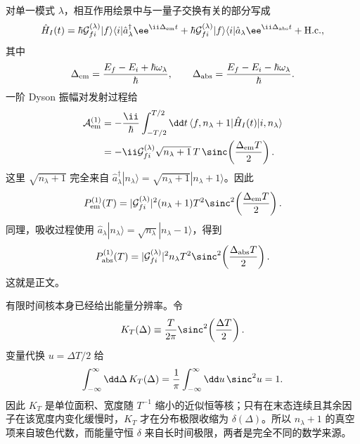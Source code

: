 \begin{derivation}
对单一模式 $\lambda$，相互作用绘景中与一量子交换有关的部分写成
\[
\hat H_I(t)
=\hbar\mathcal G_{fi}^{(\lambda)}
|f\rangle\langle i|\hat a_\lambda^\dagger
 \ee^{\ii\Delta_{\rm em}t}
+\hbar\mathcal G_{fi}^{(\lambda)}
|f\rangle\langle i|\hat a_\lambda
 \ee^{\ii\Delta_{\rm abs}t}
+\mathrm{H.c.},
\]
其中
\[
\Delta_{\rm em}
=\frac{E_f-E_i+\hbar\omega_\lambda}{\hbar},
\qquad
\Delta_{\rm abs}
=\frac{E_f-E_i-\hbar\omega_\lambda}{\hbar}.
\]
一阶 Dyson 振幅对发射过程给
\begin{align*}
\mathcal A_{\rm em}^{(1)}
&=-\frac{\ii}{\hbar}
\int_{-T/2}^{T/2}\dd t\,
\langle f,n_\lambda+1|\hat H_I(t)|i,n_\lambda\rangle\\
&=-\ii\mathcal G_{fi}^{(\lambda)}\sqrt{n_\lambda+1}
\,T\,\sinc\!\left(\frac{\Delta_{\rm em}T}{2}\right).
\end{align*}
这里 $\sqrt{n_\lambda+1}$ 完全来自
$\hat a_\lambda^\dagger|n_\lambda\rangle
=\sqrt{n_\lambda+1}|n_\lambda+1\rangle$。因此
\[
P_{\rm em}^{(1)}(T)
=|\mathcal G_{fi}^{(\lambda)}|^2(n_\lambda+1)T^2
\sinc^2\!\left(\frac{\Delta_{\rm em}T}{2}\right).
\]
同理，吸收过程使用
$\hat a_\lambda|n_\lambda\rangle=\sqrt{n_\lambda}|n_\lambda-1\rangle$，得到
\[
P_{\rm abs}^{(1)}(T)
=|\mathcal G_{fi}^{(\lambda)}|^2n_\lambda T^2
\sinc^2\!\left(\frac{\Delta_{\rm abs}T}{2}\right).
\]
这就是正文。

有限时间核本身已经给出能量分辨率。令
\[
K_T(\Delta)
\equiv\frac{T}{2\pi}\sinc^2\!\left(\frac{\Delta T}{2}\right).
\]
变量代换 $u=\Delta T/2$ 给
\[
\int_{-\infty}^{\infty}\dd\Delta\,K_T(\Delta)
=\frac1\pi\int_{-\infty}^{\infty}\dd u\,\sinc^2u=1.
\]
因此 $K_T$ 是单位面积、宽度随 $T^{-1}$ 缩小的近似恒等核；只有在末态连续且其余因子在该宽度内变化缓慢时，$K_T$ 才在分布极限收缩为 $\delta(\Delta)$。所以 $n_\lambda+1$ 的真空项来自玻色代数，而能量守恒 $\delta$ 来自长时间极限，两者是完全不同的数学来源。
\end{derivation}











